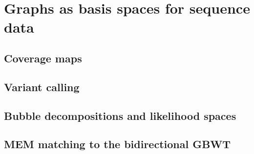 \section{Graphs as basis spaces for sequence data}

\subsection{Coverage maps}

\subsection{Variant calling}

\subsection{Bubble decompositions and likelihood spaces}

\subsection{MEM matching to the bidirectional GBWT}

